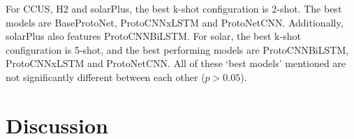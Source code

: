\documentclass{article}
\begin{document}
\begin{table}
  \centering
  \caption{Best performing model configuration for each dataset}
  \label{table:bestModels}
\end{table}

For CCUS, H2 and solarPlus, the best k-shot configuration 
is 2-shot. The best models are BaseProtoNet, ProtoCNNxLSTM and ProtoNetCNN. Additionally, solarPlus also features ProtoCNNBiLSTM.
For solar, the best k-shot configuration is 5-shot, and the best performing models are ProtoCNNBiLSTM, ProtoCNNxLSTM and ProtoNetCNN.
All of these `best models' mentioned are not significantly different between each other (\( p>0.05\)).

\section{Discussion}
\end{document}
